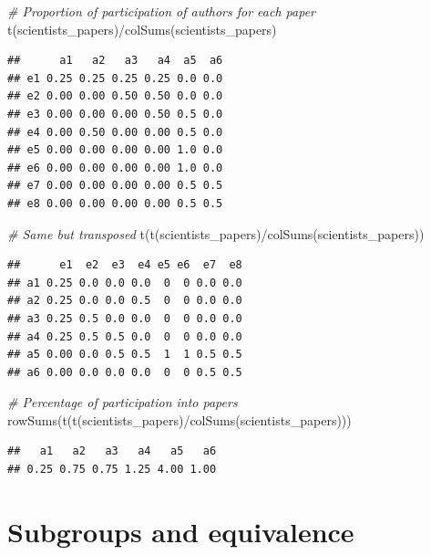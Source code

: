 \documentclass[
  notitlepage,
  onecolumn,
  openany]{book}
\newenvironment{Shaded}{\begin{snugshade}}{\end{snugshade}}
\newcommand{\CommentTok}[1]{\textcolor[rgb]{0.56,0.35,0.01}{\textit{#1}}}
\newcommand{\FunctionTok}[1]{\textcolor[rgb]{0.00,0.00,0.00}{#1}}
\newcommand{\NormalTok}[1]{#1}
\newcommand{\SpecialCharTok}[1]{\textcolor[rgb]{0.00,0.00,0.00}{#1}}
\begin{document}
\begin{Shaded}
\begin{Highlighting}[]
\CommentTok{\# Proportion of participation of authors for each paper}
\FunctionTok{t}\NormalTok{(scientists\_papers)}\SpecialCharTok{/}\FunctionTok{colSums}\NormalTok{(scientists\_papers)}
\end{Highlighting}
\end{Shaded}

\begin{verbatim}
##      a1   a2   a3   a4  a5  a6
## e1 0.25 0.25 0.25 0.25 0.0 0.0
## e2 0.00 0.00 0.50 0.50 0.0 0.0
## e3 0.00 0.00 0.00 0.50 0.5 0.0
## e4 0.00 0.50 0.00 0.00 0.5 0.0
## e5 0.00 0.00 0.00 0.00 1.0 0.0
## e6 0.00 0.00 0.00 0.00 1.0 0.0
## e7 0.00 0.00 0.00 0.00 0.5 0.5
## e8 0.00 0.00 0.00 0.00 0.5 0.5
\end{verbatim}

\begin{Shaded}
\begin{Highlighting}[]
\CommentTok{\# Same but transposed}
\FunctionTok{t}\NormalTok{(}\FunctionTok{t}\NormalTok{(scientists\_papers)}\SpecialCharTok{/}\FunctionTok{colSums}\NormalTok{(scientists\_papers))}
\end{Highlighting}
\end{Shaded}

\begin{verbatim}
##      e1  e2  e3  e4 e5 e6  e7  e8
## a1 0.25 0.0 0.0 0.0  0  0 0.0 0.0
## a2 0.25 0.0 0.0 0.5  0  0 0.0 0.0
## a3 0.25 0.5 0.0 0.0  0  0 0.0 0.0
## a4 0.25 0.5 0.5 0.0  0  0 0.0 0.0
## a5 0.00 0.0 0.5 0.5  1  1 0.5 0.5
## a6 0.00 0.0 0.0 0.0  0  0 0.5 0.5
\end{verbatim}

\begin{Shaded}
\begin{Highlighting}[]
\CommentTok{\# Percentage of participation into papers}
\FunctionTok{rowSums}\NormalTok{(}\FunctionTok{t}\NormalTok{(}\FunctionTok{t}\NormalTok{(scientists\_papers)}\SpecialCharTok{/}\FunctionTok{colSums}\NormalTok{(scientists\_papers)))}
\end{Highlighting}
\end{Shaded}

\begin{verbatim}
##   a1   a2   a3   a4   a5   a6 
## 0.25 0.75 0.75 1.25 4.00 1.00
\end{verbatim}

\hypertarget{subgroups-and-equivalence}{%
\chapter{Subgroups and equivalence}\label{subgroups-and-equivalence}}
\end{document}
